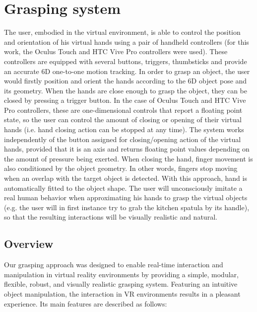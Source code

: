 \section{Grasping system}
\label{sec:graspingsystem}

The user, embodied in the virtual environment, is able to control the position and orientation of his virtual hands using a pair of handheld controllers (for this work, the Oculus Touch and HTC Vive Pro controllers were used). These controllers are equipped with several buttons, triggers, thumbsticks and provide an accurate 6D one-to-one motion tracking. In order to grasp an object, the user would firstly position and orient the hands according to the 6D object pose and its geometry. When the hands are close enough to grasp the object, they can be closed by pressing a trigger button. In the case of Oculus Touch and HTC Vive Pro controllers, these are one-dimensional controls that report a floating point state, so the user can control the amount of closing or opening of their virtual hands (i.e. hand closing action can be stopped at any time). The system works independently of the button assigned for closing/opening action of the virtual hands, provided that it is an axis and returns floating point values depending on the amount of pressure being exerted. When closing the hand, finger movement is also conditioned by the object geometry. In other words, fingers stop moving when an overlap with the target object is detected. With this approach, hand is automatically fitted to the object shape. The user will unconsciously imitate a real human behavior when approximating his hands to grasp the virtual objects (e.g. the user will in first instance try to grab the kitchen spatula by its handle), so that the resulting interactions will be visually realistic and natural.

\subsection{Overview}
\label{subsec:overview}

Our grasping approach was designed to enable real-time interaction and manipulation in virtual reality environments by providing a simple, modular, flexible, robust, and visually realistic grasping system. Featuring an intuitive object manipulation, the interaction in VR environments results in a pleasant experience. Its main features are described as follows:

